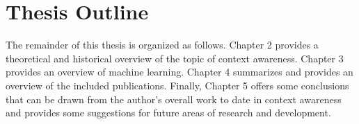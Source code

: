 \section{Thesis Outline}
\label{sec:outline}
 
The remainder of this thesis is organized as follows. Chapter 2 provides a theoretical and historical overview of the topic of context awareness. Chapter 3 provides an overview of machine learning. Chapter 4 summarizes and provides an overview of the included publications. Finally, Chapter 5 offers some conclusions that can be drawn from the author's overall work to date in context awareness and provides some suggestions for future areas of research and development.